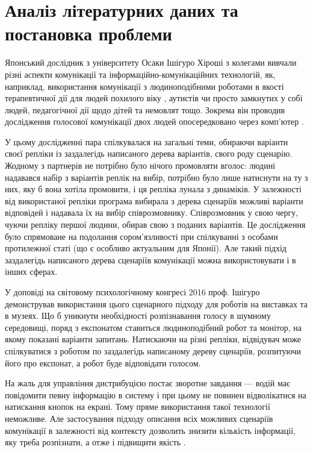 \section{Аналіз літературних даних та постановка проблеми}

Японський дослідник з університету Осаки Ішігуро Хіроші з колегами вивчали різні аспекти комунікації та інформаційно-комунікаційних технологій, як, наприклад, використання комунікації з людиноподібними роботами в якості терапевтичної дії для людей похилого віку \cite{Nishio_2015}, аутистів \cite{Kumazaki_2016} чи просто замкнутих у собі людей, педагогічної дії щодо дітей та немовлят \cite{Park_2015} тощо. Зокрема він проводив дослідження голосової комунікації двох людей опосередковано через комп’ютер \cite{Ishiguro_2016}.

У цьому дослідженні пара спілкувалася на загальні теми, обираючи варіанти своєї репліки із заздалегідь написаного дерева варіантів, свого роду сценарію. Жодному з партнерів не потрібно було нічого промовляти вголос: людині надавався набір з варіантів реплік на вибір, потрібно було лише натиснути на ту з них, яку б вона хотіла  промовити, і ця репліка лунала з динаміків. У залежності від використаної репліки програма вибирала з дерева сценаріїв можливі варіанти відповідей і надавала їх на вибір співрозмовнику. Співрозмовник у свою чергу, чуючи репліку першої людини, обирав свою з поданих варіантів. Це дослідження було спрямоване на подолання сором’язливості при спілкуванні з особами протилежної статі (що є особливо актуальним для Японії). Але такий підхід заздалегідь написаного дерева сценаріїв комунікації можна використовувати і в інших сферах.

У доповіді на світовому психологічному конгресі 2016 проф. Ішігуро демонстрував використання цього сценарного підходу для роботів на виставках та в музеях. Що б уникнути необхідності розпізнавання голосу в шумному середовищі, поряд з експонатом ставиться людиноподібний робот та монітор, на якому показані варіанти запитань. Натискаючи на різні репліки, відвідувач може спілкуватися з роботом по заздалегідь написаному дереву сценаріїв, розпитуючи його про експонат, а робот буде відповідати голосом.

На жаль для управління дистрибуцією постає зворотне завдання — водій має повідомити певну інформацію в систему і при цьому не повинен відволікатися на натискання кнопок на екрані. Тому пряме використання такої технології неможливе. Але застосування підходу описання всіх можливих сценаріїв комунікації в залежності від контексту дозволить знизити кількість інформації, яку треба розпізнати, а отже і підвищити якість \cite{art2}.

